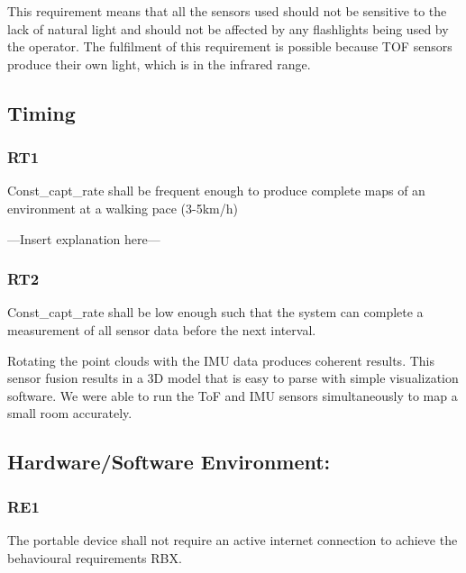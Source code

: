 \documentclass[11pt]{article}
\begin{document}
	This requirement means that all the sensors used should not be sensitive to the lack of natural light and should not be affected by any flashlights being used by the operator. The fulfilment of this requirement is possible because TOF sensors produce their own light, which is in the infrared range. 
	
	
	\subsection{Timing}
	
	\subsubsection{RT1}
	
	\begin{exampleblock}
		Const\_capt\_rate shall be frequent enough to produce complete maps of an environment at a walking pace (3-5km/h)
	\end{exampleblock}
	
	---Insert explanation here---
	
	\subsubsection{RT2}
	
	\begin{exampleblock}
		Const\_capt\_rate shall be low enough such that the system can complete a measurement of all sensor data before the next interval.
	\end{exampleblock}
	
	Rotating the point clouds with the IMU data produces coherent results. This sensor fusion results in a 3D model that is easy to parse with simple visualization software. We were able to run the ToF and IMU sensors simultaneously to map a small room accurately. 
	
	
	\subsection{Hardware/Software Environment: }
	
	\subsubsection{RE1}  
	
	\begin{exampleblock}
		The portable device shall not require an active internet connection to achieve the behavioural requirements RBX.
	\end{exampleblock}
	
\end{document}
